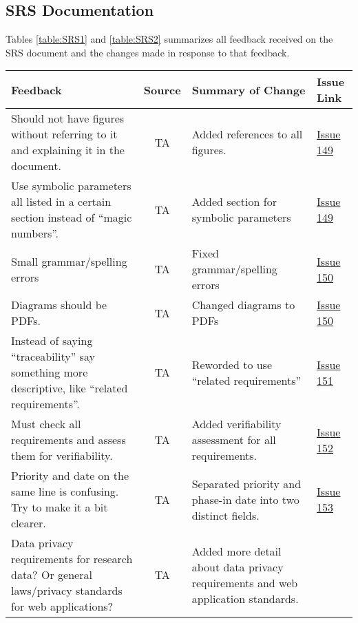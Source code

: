 \documentclass{article}
\begin{document}
\subsection{SRS Documentation}
Tables \ref{table:SRS1} and \ref{table:SRS2} summarizes all feedback received on
the SRS document and the changes made in response to that feedback.
\begin{table}[H]
\centering
\begin{tabularx}{\textwidth}{|X|c|X|p{1cm}|}
    \hline
    \textbf{Feedback} & \textbf{Source} & \textbf{Summary of Change} &
    \textbf{Issue Link} \\
    \hline
    Should not have figures without referring to it and explaining it in the
    document. & TA & Added references to all figures. &
    \href{https://github.com/SumanyaG/Alkalytics/issues/149}{Issue 149} \\
    \hline
    Use symbolic parameters all listed in a certain section instead of ``magic
    numbers''. & TA & Added section for symbolic parameters &
    \href{https://github.com/SumanyaG/Alkalytics/issues/149}{Issue 149} \\
    \hline
    Small grammar/spelling errors & TA & Fixed grammar/spelling errors &
    \href{https://github.com/SumanyaG/Alkalytics/issues/150}{Issue 150} \\
    \hline
    Diagrams should be PDFs. & TA & Changed diagrams to PDFs
    & \href{https://github.com/SumanyaG/Alkalytics/issues/150}{Issue 150} \\
    \hline
    Instead of saying ``traceability'' say something more descriptive, like
    ``related requirements''. & TA & Reworded to use ``related requirements'' &
    \href{https://github.com/SumanyaG/Alkalytics/issues/151}{Issue 151} \\
    \hline
    Must check all requirements and assess them for verifiability. & TA & Added
    verifiability assessment for all requirements. &
    \href{https://github.com/SumanyaG/Alkalytics/issues/152}{Issue 152} \\
    \hline
    Priority and date on the same line is confusing. Try to make it a bit
    clearer. & TA & Separated priority and phase-in date into two distinct
    fields. & \href{https://github.com/SumanyaG/Alkalytics/issues/153}{Issue
    153} \\
    \hline
    Data privacy requirements for research data? Or general laws/privacy
    standards for web applications? & TA & Added more detail about data privacy
    requirements and web application standards. &

\end{tabularx}
\end{table}
\end{document}
